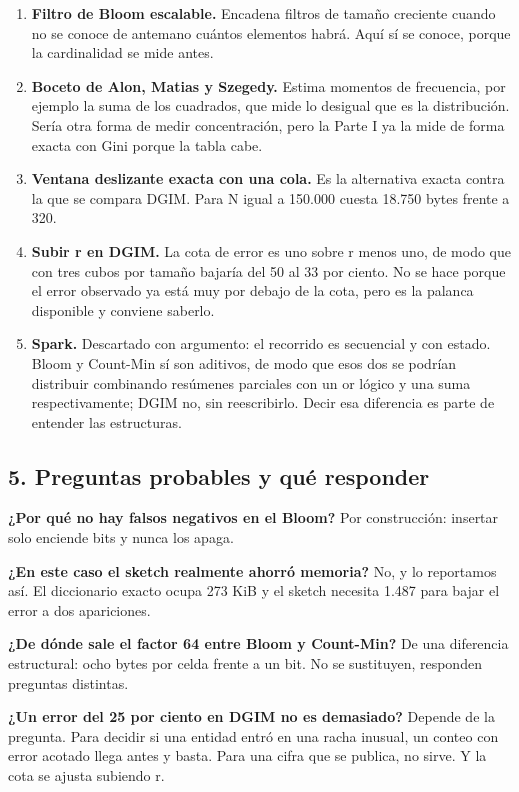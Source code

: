 \documentclass[11pt]{article}
\begin{document}
\begin{enumerate}
  \item \textbf{Filtro de Bloom escalable.} Encadena filtros de tamaño creciente cuando no se conoce de antemano cuántos elementos habrá. Aquí sí se conoce, porque la cardinalidad se mide antes.
  \item \textbf{Boceto de Alon, Matias y Szegedy.} Estima momentos de frecuencia, por ejemplo la suma de los cuadrados, que mide lo desigual que es la distribución. Sería otra forma de medir concentración, pero la Parte I ya la mide de forma exacta con Gini porque la tabla cabe.
  \item \textbf{Ventana deslizante exacta con una cola.} Es la alternativa exacta contra la que se compara DGIM. Para N igual a 150.000 cuesta 18.750 bytes frente a 320.
  \item \textbf{Subir r en DGIM.} La cota de error es uno sobre r menos uno, de modo que con tres cubos por tamaño bajaría del 50 al 33 por ciento. No se hace porque el error observado ya está muy por debajo de la cota, pero es la palanca disponible y conviene saberlo.
  \item \textbf{Spark.} Descartado con argumento: el recorrido es secuencial y con estado. Bloom y Count-Min sí son aditivos, de modo que esos dos se podrían distribuir combinando resúmenes parciales con un or lógico y una suma respectivamente; DGIM no, sin reescribirlo. Decir esa diferencia es parte de entender las estructuras.
\end{enumerate}
\subsection*{5. Preguntas probables y qué responder}
\textbf{¿Por qué no hay falsos negativos en el Bloom?} Por construcción: insertar solo enciende bits y nunca los apaga.

\textbf{¿En este caso el sketch realmente ahorró memoria?} No, y lo reportamos así. El diccionario exacto ocupa 273 KiB y el sketch necesita 1.487 para bajar el error a dos apariciones.

\textbf{¿De dónde sale el factor 64 entre Bloom y Count-Min?} De una diferencia estructural: ocho bytes por celda frente a un bit. No se sustituyen, responden preguntas distintas.

\textbf{¿Un error del 25 por ciento en DGIM no es demasiado?} Depende de la pregunta. Para decidir si una entidad entró en una racha inusual, un conteo con error acotado llega antes y basta. Para una cifra que se publica, no sirve. Y la cota se ajusta subiendo r.
\end{document}
